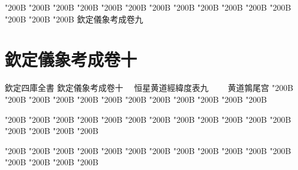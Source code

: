 \begin{正文}
\char"200B\relax{}
\char"200B\relax{}
\char"200B\relax{}
\char"200B\relax{}
\char"200B\relax{}
\char"200B\relax{}
\char"200B\relax{}
\char"200B\relax{}
\char"200B\relax{}
\char"200B\relax{}
\char"200B\relax{}
\char"200B\relax{}
\char"200B\relax{}
\char"200B\relax{}
\char"200B\relax{}
欽定儀象考成卷九
\par

\par\end{正文}\clearpage
\chapter*{欽定儀象考成卷十}
\begin{正文}
欽定四庫全書
欽定儀象考成卷十
　恒星黄道經緯度表九
　　黄道鶉尾宫
\char"200B\relax{}
\char"200B\relax{}
\char"200B\relax{}
\char"200B\relax{}
\char"200B\relax{}
\char"200B\relax{}
\char"200B\relax{}
\char"200B\relax{}
\char"200B\relax{}
\char"200B\relax{}
\char"200B\relax{}
\char"200B\relax
\par
\end{正文}\clearpage
{}
\begin{正文}
\char"200B\relax{}
\char"200B\relax{}
\char"200B\relax{}
\char"200B\relax{}
\char"200B\relax{}
\char"200B\relax{}
\char"200B\relax{}
\char"200B\relax{}
\char"200B\relax{}
\char"200B\relax{}
\char"200B\relax{}
\char"200B\relax{}
\char"200B\relax{}
\char"200B\relax{}
\char"200B\relax{}
\char"200B\relax
{}\par
\end{正文}\clearpage
{}
\begin{正文}
\char"200B\relax{}
\char"200B\relax{}
\char"200B\relax{}
\char"200B\relax{}
\char"200B\relax{}
\char"200B\relax{}
\char"200B\relax{}
\char"200B\relax{}
\char"200B\relax{}
\char"200B\relax{}
\char"200B\relax{}
\char"200B\relax{}
\char"200B\relax{}
\char"200B\relax{}
\char"200B\relax{}
\char"200B\relax
{}\par
\end{正文}\clearpage

